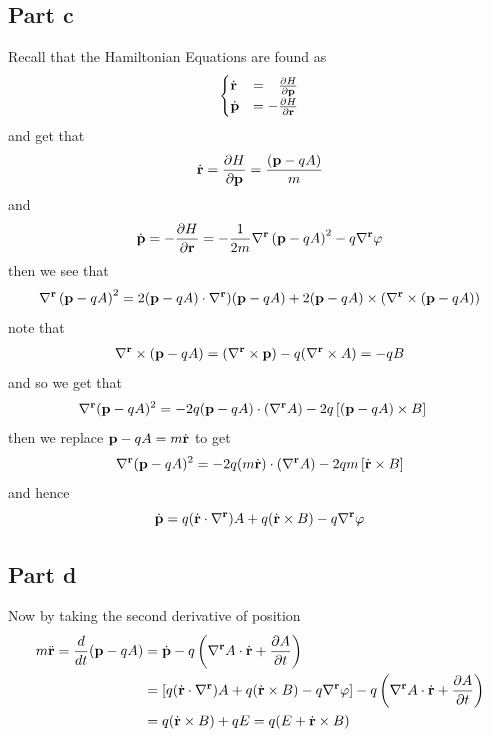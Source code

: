 \documentclass[12pt]{report}
\newcommand{\rb}{\bold{r}}
\begin{document}
\subsection*{Part c}
Recall that the Hamiltonian Equations are found as
\begin{equation*}
    \begin{cases}
        \dot{\rb} &= \phantom{-} \frac{\partial H}{\partial \bold{p}} \\
        \dot{\bold{p}} &= - \frac{\partial H}{\partial \rb}
    \end{cases}
\end{equation*}
and get that
\begin{equation*}
    \dot{\rb} = \frac{\partial H}{\partial \bold{p}} = \frac{(\bold{p} - qA)}{m}
\end{equation*}
and
\begin{align*}
    \dot{\bold{p}} =  -\frac{\partial H}{\partial \rb} = -\frac{1}{2m} \nabla^{\rb}\left(\bold{p} - qA\right)^2 - q \nabla^{\rb}\varphi 
\end{align*}
then we see that 
\begin{equation*}
    \nabla^{\rb}\left(\bold{p} - qA\right)^2 = 2 (\bold{p} - qA) \cdot \nabla^{\rb})(\bold{p} - qA) + 2(\bold{p} - qA) \times (\nabla^{\rb} \times (\bold{p} - qA))
\end{equation*}
note that
\begin{align*}
    \nabla^{\rb} \times (\bold{p} - qA) &= (\nabla^{\rb} \times \bold{p}) - q(\nabla^{\rb} \times A) = -qB \\
\end{align*}
and so we get that
\begin{align*}
     \nabla^{\rb} (\bold{p} - qA)^2 &=-2q(\bold{p} - qA)\cdot (\nabla^{\rb}A) - 2q\left[(\bold{p} - qA) \times B\right]
\end{align*}
then we replace $\bold{p} - qA = m\dot{\rb}$ to get
\begin{equation*}
    \nabla^{\rb} (\bold{p} - qA)^2 =-2q(m\dot{\rb})\cdot (\nabla^{\rb}A) - 2qm\left[\dot{\rb} \times B\right]
\end{equation*}
and hence
\begin{equation*}
    \dot{\bold{p}} = q(\dot{\rb} \cdot \nabla^{\rb})A + q(\dot{\rb} \times B) - q\nabla^{\rb}\varphi
\end{equation*}

\subsection*{Part d}
Now by taking the second derivative of position
\begin{align*}
    m\ddot{\rb} = \frac{d}{dt}(\bold{p} - qA) &= \dot{\bold{p}} - q\left(\nabla^{\rb}A \cdot \dot{\rb} + \frac{\partial A}{\partial t}\right) \\
    &= \left[q(\dot{\rb} \cdot \nabla^{\rb})A + q(\dot{\rb} \times B) - q\nabla^{\rb}\varphi\right] - q\left(\nabla^{\rb}A \cdot \dot{\rb} + \frac{\partial A}{\partial t}\right) \\
    &= q(\dot{\rb} \times B) + qE = q(E + \dot{\rb} \times B)
\end{align*}
\end{document}
